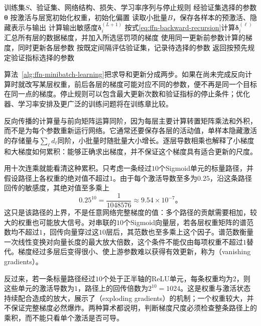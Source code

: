 \begin{algorithm}[前馈网络的小批量梯度学习]
  \label{alg:ffn-minibatch-learning}
  \begin{algorithmic}[1]
    \Require 训练集$S$、验证集、网络结构、损失、学习率序列与停止规则
    \Ensure 经验证集选择的参数$\bm{\theta}$
    \State 按激活与层宽初始化权重，初始化偏置
      \State 读取小批量$B$，保存各样本的预激活、隐藏表示与输出
      \State 计算输出敏感度$\bm{\delta}_i^{(L+1)}$
        \State 按式\eqref{eq:ffn-backward-recursion}计算$\bm{\delta}_i^{(\ell)}$
      \EndFor
      \State 汇总所有层的数据梯度，并加入所选惩罚项的梯度
      \State 使用同一更新前参数计算的梯度，同时更新各层参数
      \State 按既定间隔评估验证集，记录待选择的参数
    \EndWhile
    \State 返回按预先规定验证指标选择的参数
  \end{algorithmic}
\end{algorithm}

算法~\ref{alg:ffn-minibatch-learning}把求导和更新分成两步。如果在尚未完成反向计算时就改写某层权重，前后各层的梯度可能对应不同的参数，便不再是同一个目标在同一点的梯度。停止规则可以包含最大更新次数和验证指标的停止条件；优化器、学习率安排及更广泛的训练问题将在训练章比较。

反向传播的计算量与前向矩阵运算同阶，因为每层主要计算转置矩阵乘法和外积，而不是为每个参数重新运行网络。它通常还要保存各层的活动值，单样本隐藏激活的存储量与$\sum_\ell d_\ell$同阶，小批量时随批量大小增长。逐层导数相乘也解释了小梯度和大梯度如何累积：能够正确求出梯度，并不保证这个梯度具有适合更新的尺度。

用十次连乘就能看清这种累积。只考虑一条经过$10$个Sigmoid单元的标量路径，并假设路径上各权重的绝对值不超过$1$。由于每个激活导数至多为$0.25$，沿这条路径回传的敏感度，其绝对值至多乘上
\[
  0.25^{10}=\frac{1}{1048576}\approx9.54\times10^{-7}\text{。}
\]
这只是该路径的上界，不是任意网络完整梯度的值：多个路径的贡献需要相加，较大的权重也可能放大信号。对串联的$10$个Sigmoid向量层，若各层权重矩阵的谱范数均不超过$1$，回传向量穿过这$10$层后，其范数也至多乘上这个因子。谱范数衡量一次线性变换对向量长度的最大放大倍数，这个条件不能仅由每项权重不超过$1$替代。梯度经过多层后变得很小、使上游参数难以获得有效更新，称为（vanishing gradients）。

反过来，若一条标量路径经过$10$个处于正半轴的ReLU单元，每条权重均为$2$，则这些单元的激活导数为$1$，路径上的回传倍数为$2^{10}=1024$。这是权重与激活状态持续配合造成的放大，展示了（exploding gradients）的机制；一个权重较大，并不保证完整梯度必然爆炸。两种算术都说明，判断梯度尺度必须检查整条路径上的乘积，而不能只看单个激活是否可导。

